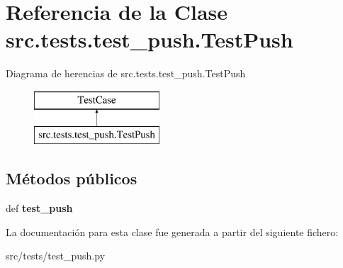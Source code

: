 \hypertarget{classsrc_1_1tests_1_1test__push_1_1_test_push}{\section{Referencia de la Clase src.\-tests.\-test\-\_\-push.\-Test\-Push}
\label{classsrc_1_1tests_1_1test__push_1_1_test_push}
}
Diagrama de herencias de src.\-tests.\-test\-\_\-push.\-Test\-Push\begin{figure}[H]
\begin{center}
\leavevmode
\includegraphics[height=2.000000cm]{classsrc_1_1tests_1_1test__push_1_1_test_push}
\end{center}
\end{figure}
\subsection*{Métodos públicos}
\begin{DoxyCompactItemize}
\item 
\hypertarget{classsrc_1_1tests_1_1test__push_1_1_test_push_a5969676ffc9ad63f8c214f6e0305267b}{def {\bfseries test\-\_\-push}}\label{classsrc_1_1tests_1_1test__push_1_1_test_push_a5969676ffc9ad63f8c214f6e0305267b}

\end{DoxyCompactItemize}


La documentación para esta clase fue generada a partir del siguiente fichero\-:\begin{DoxyCompactItemize}
\item 
src/tests/test\-\_\-push.\-py\end{DoxyCompactItemize}
